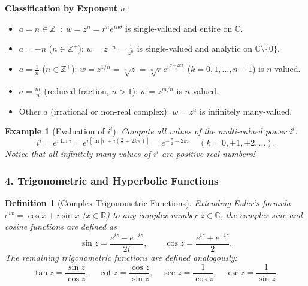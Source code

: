 \documentclass[11pt,a4paper]{article}
\theoremstyle{definitionbreak}
\newtheorem{definition}{Definition}
\theoremstyle{examplebreak}
\newtheorem{example}{Example}
\theoremstyle{plain}
\begin{document}
\textbf{Classification by Exponent $a$}:
\begin{itemize}
    \item $a = n \in \mathbb{Z}^+$: $w = z^n = r^n e^{in\theta}$ is single-valued and entire on $\mathbb{C}$.
    \item $a = -n$ ($n \in \mathbb{Z}^+$): $w = z^{-n} = \frac{1}{z^n}$ is single-valued and analytic on $\mathbb{C} \setminus \{0\}$.
    \item $a = \frac{1}{n}$ ($n \in \mathbb{Z}^+$): $w = z^{1/n} = \sqrt[n]{z} = \sqrt[n]{r} e^{i\frac{\theta + 2k\pi}{n}}$ ($k = 0, 1, \dots, n-1$) is $n$-valued.
    \item $a = \frac{m}{n}$ (reduced fraction, $n > 1$): $w = z^{m/n}$ is $n$-valued.
    \item Other $a$ (irrational or non-real complex): $w = z^a$ is infinitely many-valued.
\end{itemize}

\begin{example}[Evaluation of $i^i$]
Compute all values of the multi-valued power $i^i$:
\[
    i^i = e^{i \operatorname{Ln} i} = e^{i\left[\ln|i| + i\left(\frac{\pi}{2} + 2k\pi\right)\right]} = e^{-\frac{\pi}{2} - 2k\pi} \quad (k = 0, \pm 1, \pm 2, \dots).
\]
Notice that all infinitely many values of $i^i$ are positive real numbers!
\end{example}

\subsubsection{4. Trigonometric and Hyperbolic Functions}

\begin{definition}[Complex Trigonometric Functions]
Extending Euler's formula $e^{ix} = \cos x + i\sin x$ ($x \in \mathbb{R}$) to any complex number $z \in \mathbb{C}$, the complex sine and cosine functions are defined as
\[
    \sin z = \frac{e^{iz} - e^{-iz}}{2i}, \qquad \cos z = \frac{e^{iz} + e^{-iz}}{2}.
\]
The remaining trigonometric functions are defined analogously:
\[
    \tan z = \frac{\sin z}{\cos z}, \quad \cot z = \frac{\cos z}{\sin z}, \quad \sec z = \frac{1}{\cos z}, \quad \csc z = \frac{1}{\sin z}.
\]
\end{definition}
\end{document}

